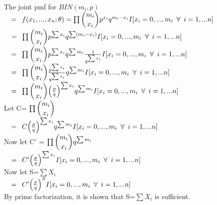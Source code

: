\\

The joint pmf for $BIN(m_i,p)$ \\

$\quad = \enskip f(x_1,...,x_n; \mathbf{\theta}) = \prod \dbinom{m_i}{x_i} p^{x_i}q^{m_i - x_i} I[x_i = 0,...,m_i \enskip \forall \enskip i=1,...n] $ \\

$\quad = \enskip \prod \dbinom{m_i}{x_i} p^{\sum{x_i}}q^{\sum(m_i - x_i)} I[x_i = 0,...,m_i \enskip \forall \enskip i=1,...n] $ \\

$\quad = \enskip \prod \dbinom{m_i}{x_i} p^{\sum{x_i}} q^{\sum{m_i}} \frac{1}{q^{\sum{x_i}}} I[x_i = 0,...,m_i \enskip \forall \enskip i=1,...n] $ \\

$\quad = \enskip \prod \dbinom{m_i}{x_i} \frac{p^{\sum{x_i}}}{q^{\sum{x_i}}}q^{\sum{m_i}} I[x_i = 0,...,m_i \enskip \forall \enskip i=1,...n] $ \\

$\quad = \enskip \prod \dbinom{m_i}{x_i} \Big( \frac{p}{q} \Big)^{\sum{x_i}} q^{\sum{m_i}} I[x_i = 0,...,m_i \enskip \forall \enskip i=1,...n] $ \\

Let C= $\prod \dbinom{m_i}{x_i}$\\

$\quad = \enskip C \Big( \frac{p}{q} \Big)^{\sum{x_i}}q^{\sum{m_i}} I[x_i = 0,...,m_i \enskip \forall \enskip i=1,...n] $ \\

Now let C$'$ = $\prod \dbinom{m_i}{x_i}q^{\sum{m_i}}$\\

$\quad = \enskip C' \Big( \frac{p}{q} \Big)^{\sum{x_i}} I[x_i = 0,...,m_i \enskip \forall \enskip i=1,...n] $ \\

Now let S=$\sum{X_i}$ \\

$\quad = \enskip  C' \Big( \frac{p}{q} \Big)^{S} I[x_i = 0,...,m_i \enskip \forall \enskip i=1,...n]$ \\

By prime factorization, it is shown that S=$\sum{X_i}$ is sufficient.
